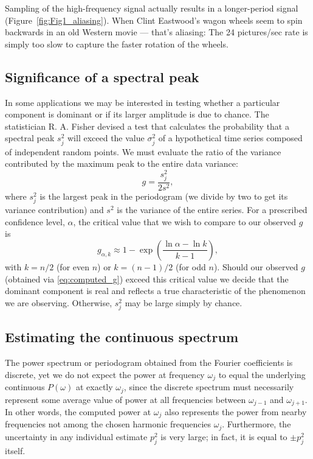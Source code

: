 Sampling of the high-frequency signal actually results in a longer-period signal (Figure~\ref{fig:Fig1_aliasing}).
When Clint Eastwood's wagon wheels seem to spin backwards in an old Western movie --- that's aliasing:  The 24 
pictures/sec rate is simply too slow to capture the faster rotation of the wheels.
	
\subsection{Significance of a spectral peak}
In some applications we may be interested in testing whether a particular 
component is dominant or if its larger amplitude is due to chance.  The statistician R. A. Fisher devised a test that 
calculates the probability that a spectral peak $s_j^2$ will exceed the value $\sigma_j^2$ of a hypothetical time series 
composed of independent random points.  We must evaluate the ratio of the variance contributed by the
maximum peak to the entire data variance:
\begin{equation}
g = \frac{s^2 _j}{2s^2},
\label{eq:computed_g}
\end{equation}
where $s^2_j$ is the largest peak in the periodogram (we divide by two to get its variance contribution)
and $s^2$ is the variance of the entire series.  For 
a prescribed confidence level, $\alpha$, the critical value that we wish to compare to our observed $g$ is
\begin{equation}
g_{\alpha,k} \approx 1 - \exp \left( \frac{\ln \alpha - \ln k}{k-1} \right ),
\label{eq:critical_g}
\end{equation}
with $k = n/2$ (for even $n$) or $k = (n-1)/2$ (for odd $n$).  Should our observed $g$ (obtained via \ref{eq:computed_g}) exceed this 
critical value we decide that the dominant component is real and reflects a true 
characteristic of the phenomenon we are observing.  Otherwise, $s^2_j$ may be large simply by 
chance.

\subsection{Estimating the continuous spectrum}

	The power spectrum or periodogram obtained from the Fourier coefficients is discrete, yet 
we do not expect the power at frequency $\omega_j$ to equal the underlying continuous $P(\omega)$ at exactly 
$\omega_j$, since the discrete spectrum must necessarily represent some average value of power at all frequencies between $\omega_{j-1}$ and 
$\omega_{j+1}$.  In other words, the computed power at $\omega_j$ also represents the power from nearby frequencies 
not among the chosen harmonic frequencies $\omega_j$.  Furthermore, the uncertainty in any individual 
estimate $p^2_j$ is very large; in fact, it is equal to $\pm p^2_j$ itself.

